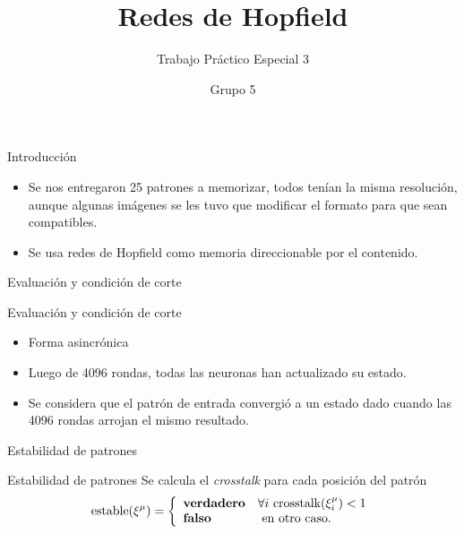 \documentclass{beamer}
\author{Grupo 5}
\title{Redes de Hopfield}
\subtitle{Trabajo Práctico Especial 3}
\institute[Sistemas de Inteligencia Artificial]{Sistemas de Inteligencia Artificial}
\begin{document}
\maketitle
\begin{frame}
\begin{block}{Introducción}
\begin{itemize}
\item Se nos entregaron 25 patrones a memorizar, todos tenían la misma resolución, aunque algunas imágenes se les tuvo que modificar el formato para que sean compatibles.
\item Se usa redes de Hopfield como memoria direccionable por el contenido.
\end{itemize}

\end{block}
\end{frame}
\begin{frame}{Evaluación y condición de corte}
\begin{block}{Evaluación y condición de corte}
\begin{itemize}
\item Forma asincrónica
\item Luego de 4096 rondas, todas las neuronas han actualizado su estado.
\item Se considera que el patrón de entrada convergió a un estado dado cuando las 4096 rondas arrojan el mismo resultado.
\end{itemize}
\end{block}
\end{frame}

\begin{frame}{Estabilidad de patrones}
\begin{block}{Estabilidad de patrones}
Se calcula el \emph{crosstalk} para cada posición del patrón
\begin{equation}
\mbox{estable}(\xi^\mu) = \left\{ \begin{array}{ll}
\mbox{\textbf{verdadero}} & \forall i \mbox{ crosstalk}(\xi^\mu_i) < 1 \\
\mbox{\textbf{falso}} &\mbox{ en otro caso.}
\end{array} \right.
\end{equation}
\end{block}
\end{frame}
\end{document}
